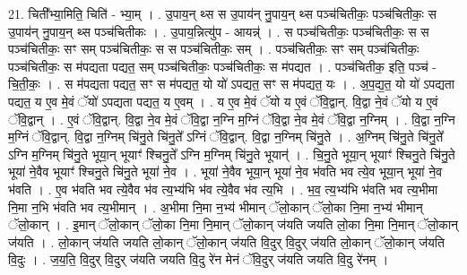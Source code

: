\documentclass[17pt]{extarticle}
\begin{document}
21. चिती᳚भ्या॒मिति॒ चिति॑ - भ्या॒म् । . उ॒पाय॒न् थ्स स उ॒पाय॑न् नु॒पाय॒न् थ्स पञ्च॑चितीकः॒ पञ्च॑चितीकः॒ स उ॒पाय॑न् नु॒पाय॒न् थ्स पञ्च॑चितीकः । . उ॒पाय॒न्नित्यु॑प - आयन्न्॑ । . स पञ्च॑चितीकः॒ पञ्च॑चितीकः॒ स स पञ्च॑चितीकः॒ सꣳ सम् पञ्च॑चितीकः॒ स स पञ्च॑चितीकः॒ सम् । . पञ्च॑चितीकः॒ सꣳ सम् पञ्च॑चितीकः॒ पञ्च॑चितीकः॒ स म॑पद्यता पद्यत॒ सम् पञ्च॑चितीकः॒ पञ्च॑चितीकः॒ स म॑पद्यत । . पञ्च॑चितीक॒ इति॒ पञ्च॑ - चि॒ती॒कः॒ । . स म॑पद्यता पद्यत॒ सꣳ स म॑पद्यत॒ यो यो॑ ऽपद्यत॒ सꣳ स म॑पद्यत॒ यः । . अ॒प॒द्य॒त॒ यो यो॑ ऽपद्यता पद्यत॒ य ए॒व मे॒वं ॅयो॑ ऽपद्यता पद्यत॒ य ए॒वम् । . य ए॒व मे॒वं ॅयो य ए॒वं ॅवि॒द्वान्. वि॒द्वा ने॒वं ॅयो य ए॒वं ॅवि॒द्वान् । . ए॒वं ॅवि॒द्वान्. वि॒द्वा ने॒व मे॒वं ॅवि॒द्वा न॒ग्नि म॒ग्निं ॅवि॒द्वा ने॒व मे॒वं ॅवि॒द्वा न॒ग्निम् । . वि॒द्वा न॒ग्नि म॒ग्निं ॅवि॒द्वान्. वि॒द्वा न॒ग्निम् चि॑नु॒ते चि॑नु॒ते᳚ ऽग्निं ॅवि॒द्वान्. वि॒द्वा न॒ग्निम् चि॑नु॒ते । . अ॒ग्निम् चि॑नु॒ते चि॑नु॒ते᳚ ऽग्नि म॒ग्निम् चि॑नु॒ते भूया॒न् भूयाꣳ॑ श्चिनु॒ते᳚ ऽग्नि म॒ग्निम् चि॑नु॒ते भूयान्॑ । . चि॒नु॒ते भूया॒न् भूयाꣳ॑ श्चिनु॒ते चि॑नु॒ते भूया॑ ने॒वैव भूयाꣳ॑ श्चिनु॒ते चि॑नु॒ते भूया॑ ने॒व । . भूया॑ ने॒वैव भूया॒न् भूया॑ ने॒व भ॑वति भव त्ये॒व भूया॒न् भूया॑ ने॒व भ॑वति । . ए॒व भ॑वति भव त्ये॒वैव भ॑व त्य॒भ्य॑भि भ॑व त्ये॒वैव भ॑व त्य॒भि । . भ॒व॒ त्य॒भ्य॑भि भ॑वति भव त्य॒भीमा नि॒मा न॒भि भ॑वति भव त्य॒भीमान् । . अ॒भीमा नि॒मा न॒भ्य॑ भीमान् ॅलो॒कान् ॅलो॒का नि॒मा न॒भ्य॑ भीमान् ॅलो॒कान् । . इ॒मान् ॅलो॒कान् ॅलो॒का नि॒मा नि॒मान् ॅलो॒कान् ज॑यति जयति लो॒का नि॒मा नि॒मान् ॅलो॒कान् ज॑यति । . लो॒कान् ज॑यति जयति लो॒कान् ॅलो॒कान् ज॑यति वि॒दुर् वि॒दुर् ज॑यति लो॒कान् ॅलो॒कान् ज॑यति वि॒दुः । . ज॒य॒ति॒ वि॒दुर् वि॒दुर् ज॑यति जयति वि॒दु रे॑न मेनं ॅवि॒दुर् ज॑यति जयति वि॒दु रे॑नम् । \newline
\end{document}
